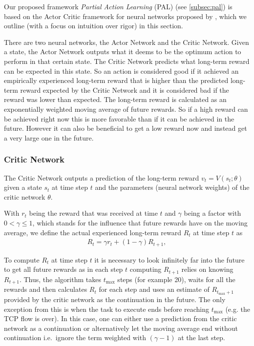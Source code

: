 \documentclass[newfonts=false,format=sigconf,10pt,letterpaper]{acmart}
\begin{document}
Our proposed framework \textit{Partial Action Learning} (PAL) (see \ref{subsec:pal}) is based on the Actor Critic framework for neural networks proposed by \citet{mnih_asynchronous_2016}, which we outline (with a focus on intuition over rigor) in this section. 

There are two neural networks, the Actor Network and the Critic Network. Given a state, the Actor Network outputs what it deems to be the optimum action to perform in that certain state. The Critic Network predicts what long-term reward can be expected in this state. So an action is considered good if it achieved an empirically experienced long-term reward that is higher than the predicted long-term reward expected by the Critic Network and it is considered bad if the reward was lower than expected. The long-term reward is calculated as an exponentially weighted moving average of future rewards. So if a high reward can be achieved right now this is more favorable than if it can be achieved in the future. However it can also be beneficial to get a low reward now and instead get a very large one in the future. 

\subsubsection{Critic Network}
\label{subsubsec:genericvalue}

The Critic Network outputs a prediction of the long-term reward $v_t = V(s_{t}; \theta)$ given a state $s_t$ at time step $t$ and the parameters (neural network weights) of the critic network $\theta$.

With $r_t$ being the reward that was received at time $t$ and $\gamma$ being a factor with $0 < \gamma \leq 1$, which stands for the influence that future rewards have on the moving average, we define the actual experienced long-term reward $R_t$ at time step $t$ as 
\begin{align}
R_t = \gamma r_{t} + (1-\gamma) R_{t+1} ,
\end{align}

To compute $R_t$ at time step $t$ it is necessary to look infinitely far into the future to get all future rewards as in each step $t$ computing $R_{t+1}$ relies on knowing $R_{t+1}$. Thus, the algorithm takes $t_\text{max}$ steps (for example 20), waits for all the rewards and then calculates $R_t$ for each step and uses an estimate of $R_{t_\text{max}+1}$ provided by the critic network as the continuation in the future. The only exception from this is when the task to execute ends before reaching $t_\text{max}$ (e.g. the TCP flow is over). In this case, one can either use a prediction from the critic network as a continuation or alternatively let the moving average end without continuation i.e.~ignore the term weighted with $(\gamma-1)$ at the last step. 
\end{document}

